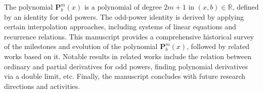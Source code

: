 The polynomial $\mathbf{P}^m_b(x)$ is a polynomial of degree $2m+1$ in $(x,b) \in \mathbb{R}$,
defined by an identity for odd powers.
The odd-power identity is derived by applying certain interpolation approaches,
including systems of linear equations and recurrence relations.
This manuscript provides a comprehensive historical survey
of the milestones and evolution of the polynomial $\mathbf{P}^m_b(x)$,
followed by related works based on it.
Notable results in related works include the relation between ordinary and partial derivatives for odd powers,
finding polynomial derivatives via a double limit, etc.
Finally, the manuscript concludes with future research directions and activities.

